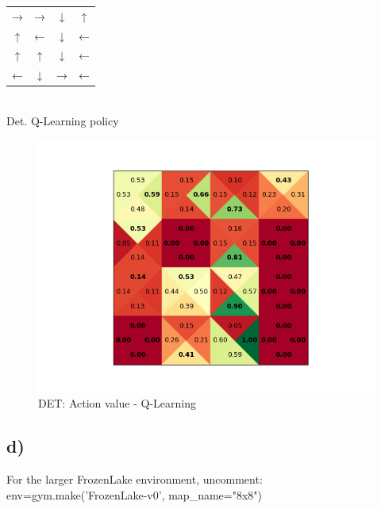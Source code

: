\documentclass[a4paper]{article}
\begin{document}
\newpage
\begin{center}
	\begin{tabular}{ c c c c }
		→ & → & ↓ & ↑ \\ 
		↑ & ← & ↓ & ← \\
		↑ & ↑ & ↓ & ← \\
		← & ↓ & → & ← 
	\end{tabular} \\\vspace{10pt}
	Det. Q-Learning policy 
\end{center}
\begin{figure}[!ht]
	\centering
	\includegraphics[width=0.8\linewidth]{det_action_value_qlearning}
	\caption{DET: Action value - Q-Learning}
	\label{fig:action_value_qlearning}
\end{figure}

\newpage
\subsection*{d)}
	For the larger FrozenLake environment, uncomment: \\
	
	env=gym.make('FrozenLake-v0', map\_name="8x8")
\end{document}
